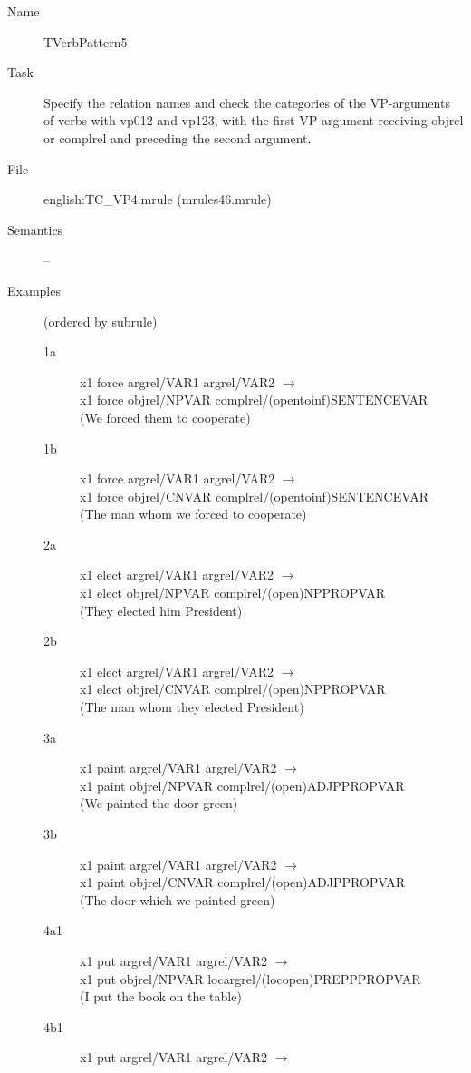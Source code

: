 \begin{description}
\vspace{1 cm}
\begin{description}
\item[Name] TVerbPattern5
\item[Task] Specify the relation names and check the categories of the 
VP-arguments
of verbs with vp012 and vp123, with the first VP argument receiving objrel or 
complrel and preceding the second argument.
\item[File] english:TC\_VP4.mrule (mrules46.mrule)
\item[Semantics] --
\item[Examples] (ordered by subrule)
  \begin{description}
  \item[1a] x1 force argrel/VAR1 argrel/VAR2 $\rightarrow$ \\
x1 force objrel/NPVAR complrel/(opentoinf)SENTENCEVAR \\
(We forced them to cooperate)
  \item[1b] x1 force argrel/VAR1 argrel/VAR2 $\rightarrow$ \\
x1 force objrel/CNVAR complrel/(opentoinf)SENTENCEVAR \\
(The man whom we forced to cooperate)
  \item[2a] x1 elect argrel/VAR1 argrel/VAR2 $\rightarrow$ \\
x1 elect objrel/NPVAR complrel/(open)NPPROPVAR \\
(They elected him President)
  \item[2b] x1 elect argrel/VAR1 argrel/VAR2 $\rightarrow$ \\
x1 elect objrel/CNVAR complrel/(open)NPPROPVAR \\
(The man whom they elected President)
  \item[3a] x1 paint argrel/VAR1 argrel/VAR2 $\rightarrow$ \\
x1 paint objrel/NPVAR complrel/(open)ADJPPROPVAR \\
(We painted the door green)
  \item[3b] x1 paint argrel/VAR1 argrel/VAR2 $\rightarrow$ \\
x1 paint objrel/CNVAR complrel/(open)ADJPPROPVAR \\
(The door which we painted green)
  \item[4a1] x1 put argrel/VAR1 argrel/VAR2 $\rightarrow$ \\
x1 put objrel/NPVAR locargrel/(locopen)PREPPPROPVAR \\
(I put the book on the table)
  \item[4b1] x1 put argrel/VAR1 argrel/VAR2 $\rightarrow$ \\

\end{description}
\end{description}
\end{description}
